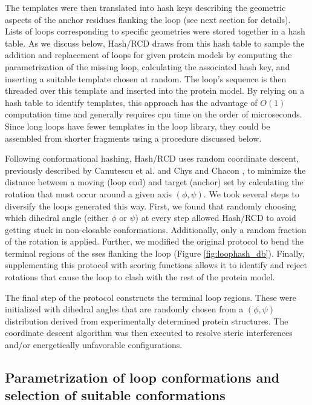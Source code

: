 The templates were then translated into hash keys describing the geometric aspects of the anchor residues flanking the loop (see next section for details). Lists of loops corresponding to specific geometries were stored together in a hash table. As we discuss below, Hash/RCD draws from this hash table to sample the addition and replacement of loops for given protein models by computing the parametrization of the missing loop, calculating the associated hash key, and inserting a suitable template chosen at random. The loop's sequence is then threaded over this template and inserted into the protein model. By relying on a hash table to identify templates, this approach has the advantage of $O(1)$ computation time and generally requires \gls{cpu} time on the order of microseconds. Since long loops have fewer templates in the loop library, they could be assembled from shorter fragments using a procedure discussed below.


Following conformational hashing, Hash/RCD uses random coordinate descent, previously described by Canutescu et al. \citep*{Canutescu2003} and Chys and Chacon \citep*{Chys2013}, to minimize the distance between a moving (loop end) and target (anchor) set by calculating the rotation that must occur around a given axis $({\phi},{\psi})$. We took several steps to diversify the loops generated this way. First, we found that randomly choosing which dihedral angle (either $\phi$ or $\psi$) at every step allowed Hash/RCD to avoid getting stuck in non-closable conformations. Additionally, only a random fraction of the rotation is applied. Further, we modified the original protocol to bend the terminal regions of the \gls{sse}s flanking the loop (Figure \ref{fig:loophash_db}). Finally, supplementing this protocol with scoring functions allows it to identify and reject rotations that cause the loop to clash with the rest of the protein model.

The final step of the protocol constructs the terminal loop regions. These were initialized with dihedral angles that are randomly chosen from a $({\phi},{\psi})$ distribution derived from experimentally determined protein structures. The coordinate descent algorithm was then executed to resolve steric interferences and/or energetically unfavorable configurations.

\subsection{Parametrization of loop conformations and selection of suitable conformations}

